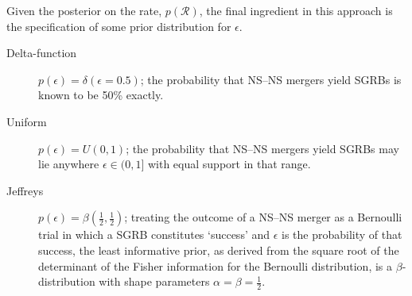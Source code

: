 \documentclass[twocolumn,nofootinbib]{revtex4-1}
\newcommand{\cbcrate}{{{\mathcal R}}}
\newcommand{\BNS}{\ac{NS}--\ac{NS}\xspace}
\newcommand{\ish}[1]{{\color{blue}{#1}}}
\begin{document}
Given the posterior on the rate, $p(\cbcrate)$, the final ingredient
in this approach is the specification of some prior distribution for
$\epsilon$.  \ish{Given the lack of information on the value and
  distribution of $\epsilon$, we choose three plausible priors and
  study their effects on our beaming angle inference.  Our choice of
  priors are:}
%
\begin{description}
\item [Delta-function] $p(\epsilon) = \delta(\epsilon=0.5)$;
        the probability that \BNS mergers yield \acp{SGRB} is known to be 50\%
        exactly.

\item [Uniform] $p(\epsilon)=U(0,1)$;
        the probability that \BNS mergers yield \acp{SGRB} may lie anywhere
    $\epsilon \in (0,1]$ with equal support in that range. 

    \item [Jeffreys] $p(\epsilon)=\beta(\frac{1}{2},\frac{1}{2})$; treating the
        outcome of a \BNS merger as a Bernoulli trial in which a \ac{SGRB}
        constitutes `success' and $\epsilon$ is the probability of that success,
        the least informative prior, as derived from the square root of the
        determinant of the Fisher information for the Bernoulli distribution, is
        a $\beta$-distribution with shape parameters $\alpha=\beta=\frac{1}{2}$.
\end{description}


\end{document}

